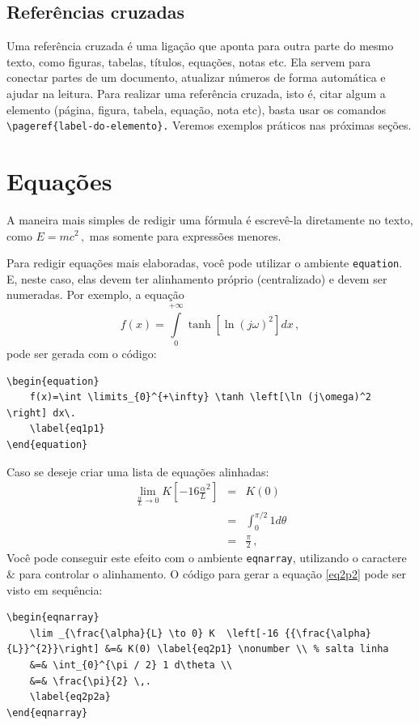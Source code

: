 \documentclass[
	12pt,				%
	openright,			%
	oneside,			%
	a4paper,			%
	english,			%
	brazil				%
	]{abntex2}
\begin{document}
\subsection{Referências cruzadas}
	Uma referência cruzada é uma ligação que aponta para outra parte do mesmo texto, como figuras, tabelas, títulos, equações, notas etc. Ela servem para conectar partes de um documento, atualizar números de forma automática e ajudar na leitura. Para realizar uma referência cruzada, isto é, citar algum a elemento (página, figura, tabela, equação, nota etc), basta usar os comandos \verb*|\pageref{label-do-elemento}.| 
	Veremos exemplos práticos nas próximas seções.

\section{Equações}
	A maneira mais simples de redigir uma fórmula é escrevê-la diretamente no texto, como $E = m c^2\,,$ mas somente para expressões menores.
	
	Para redigir equações mais elaboradas, você pode utilizar o ambiente \verb|equation|. E, neste caso, elas devem ter alinhamento próprio (centralizado) e devem ser numeradas. Por exemplo, a equação
	\begin{equation}
		f(x) = \int \limits _{0}^{+ \infty} \tanh \left[\ln (j \omega)^2 \right] dx \,, \label{eq1p1}
	\end{equation}
	\noindent pode ser gerada com o código:
\begin{lstlisting}[caption={Código da equação \ref{eq1p1}.}, label={cod:eq2p2}]
\begin{equation}
	f(x)=\int \limits_{0}^{+\infty} \tanh \left[\ln (j\omega)^2 \right] dx\.
	\label{eq1p1}
\end{equation}
\end{lstlisting}
			
Caso se deseje criar uma lista de equações alinhadas:
	\begin{eqnarray}
		\lim _{\frac{\alpha}{L} \to0} K  \left[-16 {{\frac{\alpha}{L}}^{2}}\right]  &=& K(0) \label{eq2p1} \nonumber \\ %
		&=& \int_{0}^{\pi / 2} 1 d\theta \nonumber \\
		&=& \frac{\pi}{2} \,,
		\label{eq2p2}
	\end{eqnarray}
\noindent Você pode conseguir este efeito com o ambiente \verb*|eqnarray|, utilizando o caractere $\&$ para controlar o alinhamento. O código para gerar a equação \eqref{eq2p2} pode ser visto em sequência:
\begin{lstlisting}[caption={Código da equação \ref{eq2p2}.}, label={cod:eq2p2a}]
\begin{eqnarray}
	\lim _{\frac{\alpha}{L} \to 0} K  \left[-16 {{\frac{\alpha}{L}}^{2}}\right] &=& K(0) \label{eq2p1} \nonumber \\ % salta linha
	&=& \int_{0}^{\pi / 2} 1 d\theta \\
	&=& \frac{\pi}{2} \,.
	\label{eq2p2a}
\end{eqnarray}	
\end{lstlisting}	
		
\end{document}
